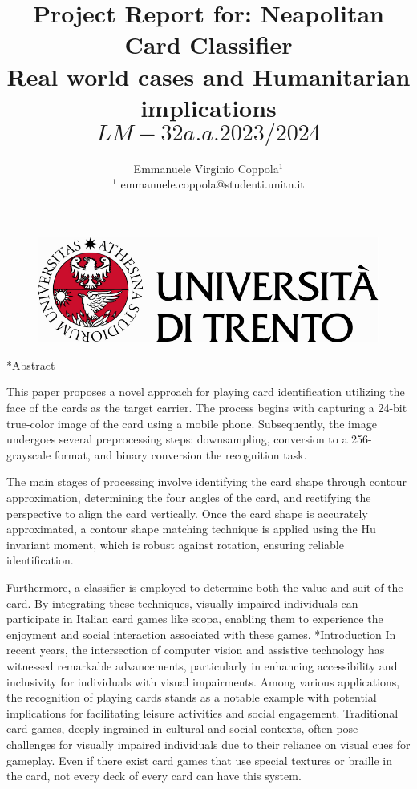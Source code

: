 \documentclass[twocolumn, a4paper,10pt]{article}
\title{%
Project Report for: Neapolitan Card Classifier\\																								%
\vspace{4pt}
Real world cases and Humanitarian implications \[LM-32 a.a. 2023/2024\]
} 																																%
\author{																																														%
Emmanuele Virginio Coppola$^1$\\ 																										%
$^1$ emmanuele.coppola@studenti.unitn.it\\ 																																	%
\phantom{Line 9}} 																																									%
\date{\vspace{-0.5cm}}	%
\makeatletter
\renewcommand\section{\@startsection{section}{1}{\z@}{3pt}{3pt}{\normalfont\large\bfseries}}
\makeatother
\begin{document}
\maketitle
\begin{figure}
  \centering

\includegraphics[scale=0.6]{img/Logo.pdf} 																																	%
\end{figure}
\section*{Abstract}	%
\addtocounter{section}{1}

This paper proposes a novel approach for playing card identification utilizing the face of the cards as the target carrier. The process begins with capturing a 24-bit true-color image of the card using a mobile phone. Subsequently, the image undergoes several preprocessing steps: downsampling, conversion to a 256-grayscale format, and binary conversion the recognition task.

The main stages of processing involve identifying the card shape through contour approximation, determining the four angles of the card, and rectifying the perspective to align the card vertically. Once the card shape is accurately approximated, a contour shape matching technique is applied using the Hu invariant moment, which is robust against rotation, ensuring reliable identification.

Furthermore, a classifier is employed to determine both the value and suit of the card. By integrating these techniques, visually impaired individuals can participate in Italian card games like scopa, enabling them to experience the enjoyment and social interaction associated with these games.
\section*{Introduction}
In recent years, the intersection of computer vision and assistive technology has witnessed remarkable advancements, particularly in enhancing accessibility and inclusivity for individuals with visual impairments. Among various applications, the recognition of playing cards stands as a notable example with potential implications for facilitating leisure activities and social engagement. Traditional card games, deeply ingrained in cultural and social contexts, often pose challenges for visually impaired individuals due to their reliance on visual cues for gameplay. Even if there exist card games that use special textures or braille in the card, not every deck of every card can have this system.
\end{document}

